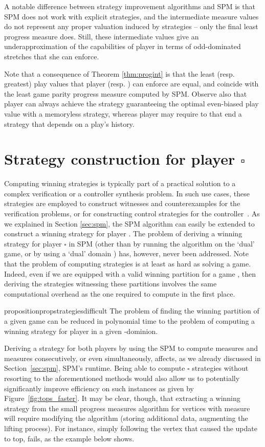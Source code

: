 \documentclass{eptcs}
\newcommand{\odd}{\ensuremath{\square}\xspace}
\begin{document}
A notable difference between strategy improvement algorithms and SPM is
that SPM does not work with explicit strategies, and the intermediate
measure values do not represent any proper valuation induced by
strategies -- only the final least progress measure does. Still,
these intermediate values give an underapproximation of the
capabilities of player  in terms of odd-dominated stretches
that she can enforce.

Note that a consequence of Theorem \ref{thm:progint} is that the least (resp. greatest) play values that player  (resp. ) can enforce are equal, and coincide with the least game parity progress measure  computed by SPM. 
Observe also that player  can always achieve the strategy guaranteeing the optimal even-biased play value with a memoryless strategy, whereas player  may require to that end a strategy that depends on a play's history.

\section{Strategy construction for player \odd}
\label{sec:strategy}

Computing winning strategies is typically part of a practical
solution to a complex verification or a controller synthesis problem.
In such use cases, these strategies are employed to
construct witnesses and counterexamples for the verification problems,
or for constructing control strategies for the controller~\cite{AVW:03}.
As we explained in Section \ref{sec:spm}, the SPM algorithm can
easily be extended to construct a winning strategy for player
. The problem of deriving a winning strategy for player \odd
in SPM (other than by running the algorithm on the `dual' game, or
by using a `dual' domain ) has, however, never
been addressed. Note that the problem of computing strategies is
at least as hard as solving a game. Indeed, even if we are equipped
with a valid winning partition  for
a game , then deriving the strategies witnessing these partitions
involves the same computational overhead as the one required to
compute  in the first place.
\begin{restatable}{proposition}{propstrategiesdifficult} 
\label{prop:strategies_difficult}
The problem of finding the winning partition
 of a given game  can be reduced
in polynomial time to the problem of computing a winning strategy
for player  in a given -dominion.
\end{restatable}

Deriving a strategy for both players by using the SPM to compute
 measures and  measures
consecutively, or even simultaneously, affects, as we already
discussed in Section~\ref{sec:spm}, SPM's runtime.    Being able
to compute \odd strategies without resorting to the aforementioned
methods would also allow us to potentially significantly improve
efficiency on such instances as given by Figure~\ref{fig:tops_faster}.
It may be clear, though, that extracting a winning strategy from
the small progress measures algorithm for vertices with measure
 will require modifying the algorithm (storing additional
data, augmenting the lifting process).  For instance, simply following
the vertex that caused the update to top, fails, as the example
below shows.
\end{document}

